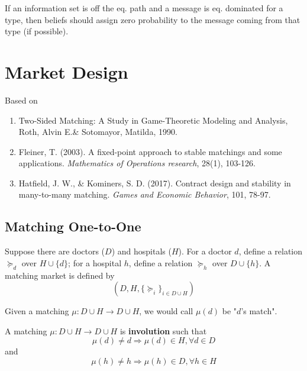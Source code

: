 \documentclass[11pt]{elegantbook}
\begin{document}
\begin{definition}
    \normalfont
    If an information set is off the eq. path and a message is eq. dominated for a type, then beliefs should assign zero probability to the message coming from that type (if possible).
\end{definition}















\chapter{Market Design}
Based on
\begin{enumerate}[$\circ$]
    \item Two-Sided Matching: A Study in Game-Theoretic Modeling and Analysis, Roth, Alvin E.\& Sotomayor, Matilda, 1990.
    \item Fleiner, T. (2003). A fixed-point approach to stable matchings and some applications. \textit{Mathematics of Operations research}, 28(1), 103-126.
    \item Hatfield, J. W., \& Kominers, S. D. (2017). Contract design and stability in many-to-many matching. \textit{Games and Economic Behavior}, 101, 78-97.
\end{enumerate}
\section{Matching One-to-One}
Suppose there are doctors ($D$) and hospitals ($H$). For a doctor $d$, define a relation $\succeq_d$ over $H\cup\{d\}$; for a hospital $h$, define a relation $\succeq_h$ over $D\cup\{h\}$. A matching market is defined by $$\left(D,H,\{\succeq_i\}_{i\in D\cup H}\right)$$

\begin{note}
    Given a matching $\mu: D\cup H \rightarrow D\cup H$, we would call $\mu(d)$ be "$d$'s match".
\end{note}

\begin{definition}[Involution]
    \normalfont
    A matching $\mu: D\cup H \rightarrow D\cup H$ is \textbf{involution} such that $$\mu (d)\neq d \Rightarrow \mu(d)\in H, \forall d\in D$$ and $$\mu (h)\neq h \Rightarrow \mu(h)\in D, \forall h\in H$$
\end{definition}
\end{document}
